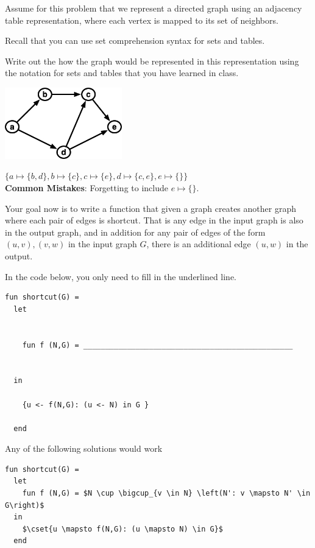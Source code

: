 \begin{problem}

Assume for this problem that we represent a directed graph using an
adjacency table representation, where each vertex is mapped to its set
of neighbors. 

Recall that you can use set comprehension syntax for sets and tables.

\ask[5]
Write out the how the graph would be represented in this
representation using the notation for sets and tables that you have
learned in class.

\begin{center}
\includegraphics[width=2in]{media/digraph-1.jpg}
\end{center}

\sol
$\{a \mapsto \{b,d\}, b \mapsto \{c\}, c \mapsto \{e\}, d \mapsto \{c,e\}, e \mapsto \{\} \}$ \\

\notes
\textbf{Common Mistakes}: Forgetting to include $e \mapsto \{\}$. 


\ask[12]
Your goal now is to write a function that given a graph creates
another graph where each pair of edges is shortcut.  That is any edge
in the input graph is also in the output graph, and in addition for
any pair of edges of the form $(u,v),(v,w)$ in the input graph $G$,
there is an additional edge $(u,w)$ in the output.

In the code below, you only need to fill in the underlined line. 

\begin{lstlisting}[numbers=none]
fun shortcut(G) = 
  let 


    fun f (N,G) = ________________________________________________


  in   

    {u <- f(N,G): (u <- N) in G }

  end

\end{lstlisting}

\sol
Any of the following solutions would work 
\begin{lstlisting}[numbers=none]
fun shortcut(G) = 
  let 
    fun f (N,G) = $N \cup \bigcup_{v \in N} \left(N': v \mapsto N' \in G\right)$
  in   
    $\cset{u \mapsto f(N,G): (u \mapsto N) \in G}$
  end
\end{lstlisting}


\end{problem}

